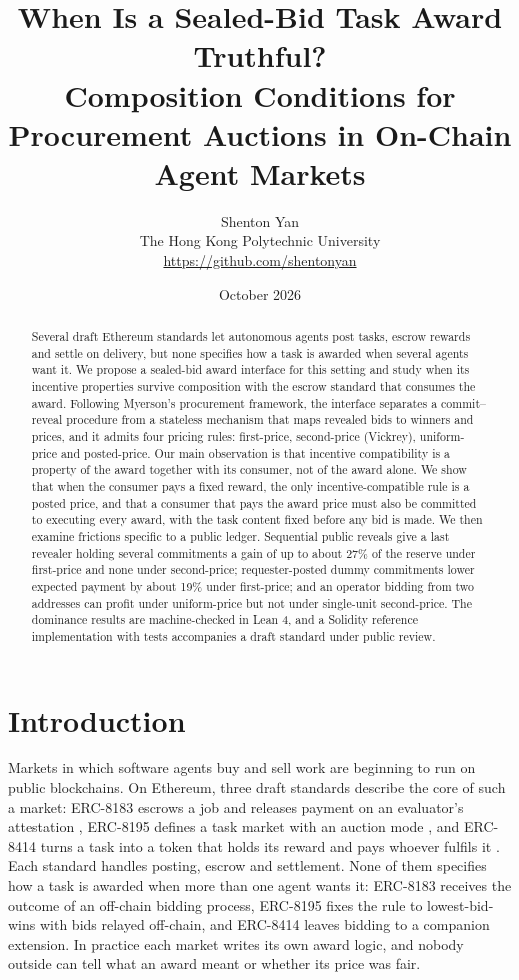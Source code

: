 \documentclass[11pt]{article}
\title{When Is a Sealed-Bid Task Award Truthful?\\Composition Conditions for Procurement Auctions in On-Chain Agent Markets}
\author{Shenton Yan\\[2pt]
\small The Hong Kong Polytechnic University\\
\small \url{https://github.com/shentonyan}}
\date{October 2026}
\theoremstyle{definition}
\theoremstyle{remark}
\begin{document}
\maketitle

\begin{abstract}
Several draft Ethereum standards let autonomous agents post tasks, escrow rewards and settle on delivery, but none specifies how a task is awarded when several agents want it. We propose a sealed-bid award interface for this setting and study when its incentive properties survive composition with the escrow standard that consumes the award. Following Myerson's procurement framework, the interface separates a commit--reveal procedure from a stateless mechanism that maps revealed bids to winners and prices, and it admits four pricing rules: first-price, second-price (Vickrey), uniform-price and posted-price. Our main observation is that incentive compatibility is a property of the award together with its consumer, not of the award alone. We show that when the consumer pays a fixed reward, the only incentive-compatible rule is a posted price, and that a consumer that pays the award price must also be committed to executing every award, with the task content fixed before any bid is made. We then examine frictions specific to a public ledger. Sequential public reveals give a last revealer holding several commitments a gain of up to about 27\% of the reserve under first-price and none under second-price; requester-posted dummy commitments lower expected payment by about 19\% under first-price; and an operator bidding from two addresses can profit under uniform-price but not under single-unit second-price. The dominance results are machine-checked in Lean 4, and a Solidity reference implementation with tests accompanies a draft standard under public review.
\end{abstract}

\section{Introduction}

Markets in which software agents buy and sell work are beginning to run on public blockchains. On Ethereum, three draft standards describe the core of such a market: ERC-8183 escrows a job and releases payment on an evaluator's attestation \citep{erc8183}, ERC-8195 defines a task market with an auction mode \citep{erc8195}, and ERC-8414 turns a task into a token that holds its reward and pays whoever fulfils it \citep{erc8414}. Each standard handles posting, escrow and settlement. None of them specifies how a task is awarded when more than one agent wants it: ERC-8183 receives the outcome of an off-chain bidding process, ERC-8195 fixes the rule to lowest-bid-wins with bids relayed off-chain, and ERC-8414 leaves bidding to a companion extension. In practice each market writes its own award logic, and nobody outside can tell what an award meant or whether its price was fair.
\end{document}
